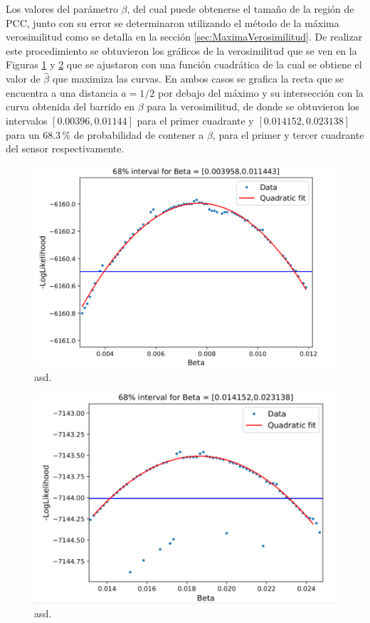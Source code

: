 \noindent Los valores del parámetro $\beta$, del cual puede obtenerse el tamaño de la región de PCC, junto con su error se determinaron utilizando el método de la máxima verosimilitud como se detalla en la sección \ref{sec:MaximaVerosimilitud}. De realizar este procedimiento se obtuvieron los gráficos de la verosimilitud que se ven en la Figuras \ref{fig:LL_beta_OHDU1} y \ref{fig:LL_beta_OHDU3} que se ajustaron con una función cuadrática de la cual se obtiene el valor de $\hat{\beta}$ que maximiza las curvas. En ambos casos se grafica la recta que se encuentra a una distancia $a=1/2$ por debajo del máximo y su intersección con la curva obtenida del barrido en $\beta$ para la verosimilitud, de donde se obtuvieron los intervalos $[0.00396, 0.01144]$ para el primer cuadrante y $[0.014152, 0.023138]$ para un $68.3\,\%$ de probabilidad de contener a $\beta$, para el primer y tercer cuadrante del sensor respectivamente.
\begin{figure}[H]
    \centering
        \includegraphics[scale=0.4]{pngs/LL_beta_OHDU1.png}
    \caption{\footnotesize{asd.}}
    \label{fig:LL_beta_OHDU1}
\end{figure}
\begin{figure}[H]
    \centering
        \includegraphics[scale=0.4]{pngs/LL_beta_OHDU3.png}
    \caption{\footnotesize{asd.}}
    \label{fig:LL_beta_OHDU3}
\end{figure}
